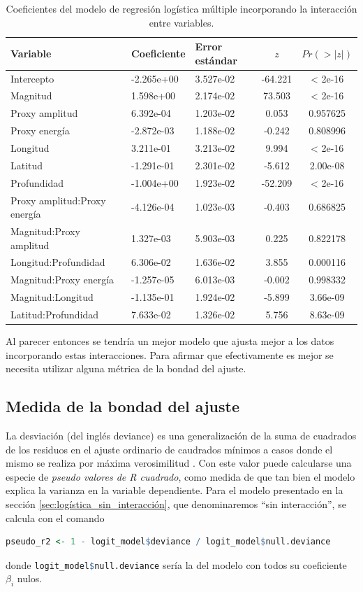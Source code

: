 \documentclass[a4paper]{report}
\begin{document}
\begin{table}
	\centering
	\begin{tabular}{lllcc}
		\toprule
		Variable & Coeficiente & Error estándar & \(z\) & \(Pr(>|z|)\) \\
		\midrule
		Intercepto & -2.265e+00 & 3.527e-02 & -64.221 & < 2e-16 \\
		Magnitud & 1.598e+00 & 2.174e-02 & 73.503 & < 2e-16 \\
		Proxy amplitud & 6.392e-04 & 1.203e-02 & 0.053 & 0.957625 \\
		Proxy energía & -2.872e-03 & 1.188e-02 & -0.242 & 0.808996 \\
		Longitud & 3.211e-01 & 3.213e-02 & 9.994 & < 2e-16 \\
		Latitud & -1.291e-01 & 2.301e-02 & -5.612 & 2.00e-08 \\
		Profundidad & -1.004e+00 & 1.923e-02 & -52.209 & < 2e-16 \\
		Proxy amplitud:Proxy energía & -4.126e-04 & 1.023e-03 & -0.403 & 0.686825 \\
		Magnitud:Proxy amplitud & 1.327e-03 & 5.903e-03 & 0.225 & 0.822178 \\
		Longitud:Profundidad & 6.306e-02 & 1.636e-02 & 3.855 & 0.000116 \\
		Magnitud:Proxy energía & -1.257e-05 & 6.013e-03 & -0.002 & 0.998332 \\
		Magnitud:Longitud & -1.135e-01 & 1.924e-02 & -5.899 & 3.66e-09 \\
		Latitud:Profundidad & 7.633e-02 & 1.326e-02 & 5.756 & 8.63e-09 \\
		\bottomrule
	\end{tabular}
	\caption{Coeficientes del modelo de regresión logística múltiple incorporando la interacción entre variables.}
	\label{tab:coeficientes_interaccion}
\end{table}

Al parecer entonces se tendría un mejor modelo que ajusta mejor a los datos incorporando estas interacciones.
Para afirmar que efectivamente es mejor se necesita utilizar alguna métrica de la bondad del ajuste.



\subsection{Medida de la bondad del ajuste}\label{sec:bondad}
La desviación (del inglés deviance) es una generalización de la suma de cuadrados de los residuos en el ajuste ordinario de caudrados mínimos a casos donde el mismo se realiza por máxima verosimilitud \cite[sección 7.2]{hastie_elements_2009}.
Con este valor puede calcularse una especie de \emph{pseudo valores de R cuadrado}, como medida de que tan bien el modelo explica la varianza en la variable dependiente.
Para el modelo presentado en la sección \ref{sec:logística_sin_interacción}, que denominaremos ``sin interacción'', se calcula con el comando
\begin{lstlisting}[language=R, breaklines=true]
	pseudo_r2 <- 1 - logit_model$deviance / logit_model$null.deviance
\end{lstlisting}
donde \lstinline[language=R]{logit_model$null.deviance} sería la del modelo con todos su coeficiente \(\beta_i\) nulos. 
\end{document}

